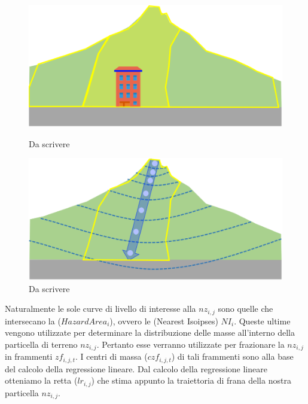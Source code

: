 \begin{figure}[h]
	\hspace{0.05\linewidth}
	\begin{minipage}[t]{0.4\linewidth}
		\centering
		\includegraphics[width=\textwidth]{images/landslide0}
		\caption{Da scrivere}
		\label{landslide0}
	\end{minipage}
	\hspace{0.05\linewidth}
	\begin{minipage}[t]{0.4\linewidth}
		\centering
		\includegraphics[width=\textwidth]{images/landslide1}
		\caption{Da scrivere}
		\label{landslide1}
	\end{minipage}
\end{figure}

Naturalmente le sole curve di livello di interesse alla $nz_{i,j}$ sono quelle che intersecano la ($HazardArea_i$), ovvero le (Nearest Isoipses) $NI_i$.
Queste ultime vengono utilizzate per determinare la distribuzione delle masse all'interno della particella di terreno $nz_{i,j}$. Pertanto esse verranno utilizzate per frazionare la $nz_{i,j}$  in frammenti $zf_{i,j,t}$. I centri di massa ($czf_{i,j,t}$) di tali frammenti sono alla base del calcolo della regressione lineare. Dal calcolo della regressione lineare otteniamo la retta ($lr_{i,j}$) che stima appunto la traiettoria di frana della nostra particella $nz_{i,j}$. 

